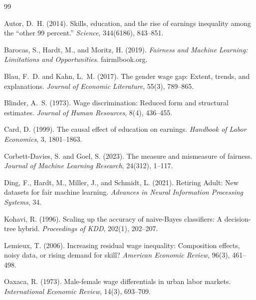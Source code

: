 \documentclass[11pt]{article}
\begin{document}

\begin{thebibliography}{99}

Autor, D.~H. (2014).
\newblock Skills, education, and the rise of earnings inequality among the
  ``other 99 percent.''
\newblock \textit{Science}, 344(6186), 843--851.

Barocas, S., Hardt, M., and Moritz, H. (2019).
\newblock \textit{Fairness and Machine Learning: Limitations and Opportunities}.
\newblock fairmlbook.org.

Blau, F.~D. and Kahn, L.~M. (2017).
\newblock The gender wage gap: Extent, trends, and explanations.
\newblock \textit{Journal of Economic Literature}, 55(3), 789--865.

Blinder, A.~S. (1973).
\newblock Wage discrimination: Reduced form and structural estimates.
\newblock \textit{Journal of Human Resources}, 8(4), 436--455.

Card, D. (1999).
\newblock The causal effect of education on earnings.
\newblock \textit{Handbook of Labor Economics}, 3, 1801--1863.

Corbett-Davies, S. and Goel, S. (2023).
\newblock The measure and mismeasure of fairness.
\newblock \textit{Journal of Machine Learning Research}, 24(312), 1--117.

Ding, F., Hardt, M., Miller, J., and Schmidt, L. (2021).
\newblock Retiring Adult: New datasets for fair machine learning.
\newblock \textit{Advances in Neural Information Processing Systems}, 34.

Kohavi, R. (1996).
\newblock Scaling up the accuracy of naive-Bayes classifiers: A decision-tree
  hybrid.
\newblock \textit{Proceedings of KDD}, 202(1), 202--207.

Lemieux, T. (2006).
\newblock Increasing residual wage inequality: Composition effects, noisy data,
  or rising demand for skill?
\newblock \textit{American Economic Review}, 96(3), 461--498.

Oaxaca, R. (1973).
\newblock Male-female wage differentials in urban labor markets.
\newblock \textit{International Economic Review}, 14(3), 693--709.


\end{thebibliography}
\end{document}
